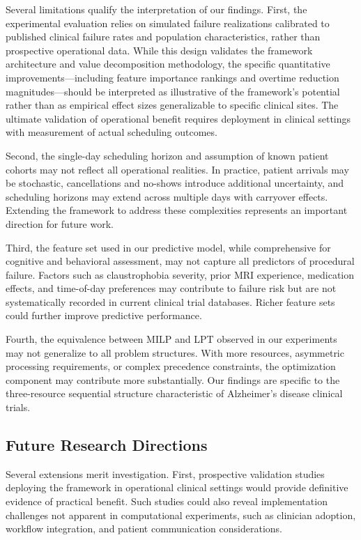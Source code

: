 \documentclass[11pt,a4paper]{article}
\begin{document}
Several limitations qualify the interpretation of our findings. First, the experimental evaluation relies on simulated failure realizations calibrated to published clinical failure rates and population characteristics, rather than prospective operational data. While this design validates the framework architecture and value decomposition methodology, the specific quantitative improvements---including feature importance rankings and overtime reduction magnitudes---should be interpreted as illustrative of the framework's potential rather than as empirical effect sizes generalizable to specific clinical sites. The ultimate validation of operational benefit requires deployment in clinical settings with measurement of actual scheduling outcomes.

Second, the single-day scheduling horizon and assumption of known patient cohorts may not reflect all operational realities. In practice, patient arrivals may be stochastic, cancellations and no-shows introduce additional uncertainty, and scheduling horizons may extend across multiple days with carryover effects. Extending the framework to address these complexities represents an important direction for future work.

Third, the feature set used in our predictive model, while comprehensive for cognitive and behavioral assessment, may not capture all predictors of procedural failure. Factors such as claustrophobia severity, prior MRI experience, medication effects, and time-of-day preferences may contribute to failure risk but are not systematically recorded in current clinical trial databases. Richer feature sets could further improve predictive performance.

Fourth, the equivalence between MILP and LPT observed in our experiments may not generalize to all problem structures. With more resources, asymmetric processing requirements, or complex precedence constraints, the optimization component may contribute more substantially. Our findings are specific to the three-resource sequential structure characteristic of Alzheimer's disease clinical trials.

\subsection{Future Research Directions}

Several extensions merit investigation. First, prospective validation studies deploying the framework in operational clinical settings would provide definitive evidence of practical benefit. Such studies could also reveal implementation challenges not apparent in computational experiments, such as clinician adoption, workflow integration, and patient communication considerations.
\end{document}
